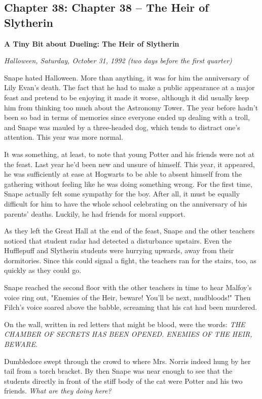 \documentclass[a4paper,11pt]{article}
\begin{document}
\subsection{Chapter 38: Chapter 38 – The Heir of Slytherin}

\textbf{A Tiny Bit about Dueling: The Heir of Slytherin}

\emph{Halloween, Saturday, October 31, 1992 (two days before the first quarter)}

Snape hated Halloween. More than anything, it was for him the anniversary of Lily Evan's death. The fact that he had to make a public appearance at a major feast and pretend to be enjoying it made it worse, although it did usually keep him from thinking too much about the Astronomy Tower. The year before hadn't been so bad in terms of memories since everyone ended up dealing with a troll, and Snape was mauled by a three-headed dog, which tends to distract one's attention. This year was more normal.

It was something, at least, to note that young Potter and his friends were not at the feast. Last year he'd been new and unsure of himself. This year, it appeared, he was sufficiently at ease at Hogwarts to be able to absent himself from the gathering without feeling like he was doing something wrong. For the first time, Snape actually felt some sympathy for the boy. After all, it must be equally difficult for him to have the whole school celebrating on the anniversary of his parents' deaths. Luckily, he had friends for moral support.

As they left the Great Hall at the end of the feast, Snape and the other teachers noticed that student radar had detected a disturbance upstairs. Even the Hufflepuff and Slytherin students were hurrying upwards, away from their dormitories. Since this could signal a fight, the teachers ran for the stairs, too, as quickly as they could go.

Snape reached the second floor with the other teachers in time to hear Malfoy's voice ring out, "Enemies of the Heir, beware! You'll be next, mudbloods!" Then Filch's voice soared above the babble, screaming that his cat had been murdered.

On the wall, written in red letters that might be blood, were the words: \emph{THE CHAMBER OF SECRETS HAS BEEN OPENED. ENEMIES OF THE HEIR, BEWARE}.

Dumbledore swept through the crowd to where Mrs. Norris indeed hung by her tail from a torch bracket. By then Snape was near enough to see that the students directly in front of the stiff body of the cat were Potter and his two friends. \emph{What are they doing here?}
\end{document}
